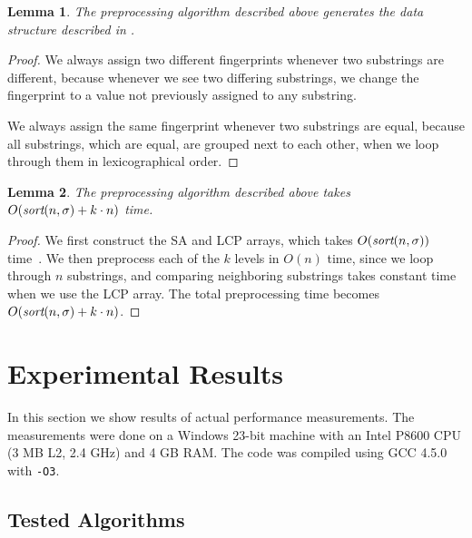 \documentclass[a4]{article}
\newcommand*{\pref}{\prettyref}
\newtheorem{lemma}{Lemma}
\begin{document}
\begin{lemma}
The preprocessing algorithm described above generates the data structure described in \pref{sec:fingerprint-ds}.
\end{lemma}

\begin{proof}
We always assign two different fingerprints whenever two substrings are different, because whenever we see two differing substrings, we change the fingerprint to a value not previously assigned to any substring.

We always assign the same fingerprint whenever two substrings are equal, because all substrings, which are equal, are grouped next to each other, when we loop through them in lexicographical order.
\end{proof}

\begin{samepage}
\begin{lemma}
The preprocessing algorithm described above takes $O(\textit{sort}(n,\sigma) + k\cdot n)$ time.
\end{lemma}
\begin{proof}
We first construct the SA and LCP arrays, which takes $O(\textit{sort}(n,\sigma))$ time~\cite{sort-complexity}. We then preprocess each of the $k$ levels in $O(n)$ time, since we loop through $n$ substrings, and comparing neighboring substrings takes constant time when we use the LCP array. The total preprocessing time becomes $O(\textit{sort}(n,\sigma)\\ + k\cdot n)$.
\end{proof}
\end{samepage}

\section{Experimental Results\label{sec:results}}

In this section we show results of actual performance measurements. The measurements were done on a Windows 23-bit machine with an Intel P8600 CPU (3 MB L2, 2.4 GHz) and 4 GB RAM. The code was compiled using GCC 4.5.0 with \texttt{-O3}.

\subsection{Tested Algorithms}
\end{document}
